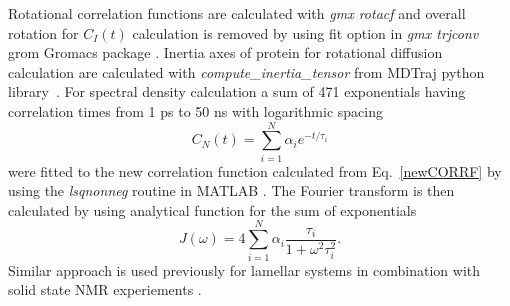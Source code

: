 \documentclass[pre,aps,floatfix,authordate1-4,twocolumn]{revtex4-1}
\begin{document}
Rotational correlation functions are calculated with {\it gmx rotacf}
and overall rotation for $C_I(t)$ calculation is removed by using fit option
in {\it gmx trjconv} grom Gromacs package \cite{gromacsMANUAL}.
Inertia axes of protein for rotational diffusion calculation
are calculated with {\it compute\_inertia\_tensor} from
MDTraj python library~\cite{McGibbon2015MDTraj}.
For spectral density calculation a sum of 471 exponentials
having correlation times from 1 ps to 50 ns with logarithmic
spacing
\begin{equation}\label{gprime_fit}
C_N(t)=\sum_{i=1}^{N}\alpha_i e^{-t/\tau_i}
\end{equation}
were fitted to the new correlation function
calculated from Eq.~\ref{newCORRF}
by using the {\it lsqnonneg} routine in MATLAB \cite{matlab}.
The Fourier transform is then calculated by using analytical function
for the sum of exponentials 
\begin{equation}\label{FTanal}
J(\omega) =  4 \sum_{i=1}^{N}\alpha_i\frac{\tau_i}{1+\omega^2\tau_i^2}.
\end{equation}
Similar approach is used previously for lamellar systems in combination
with solid state NMR experiements \cite{nowacka13,ferreira15}.
\end{document}
